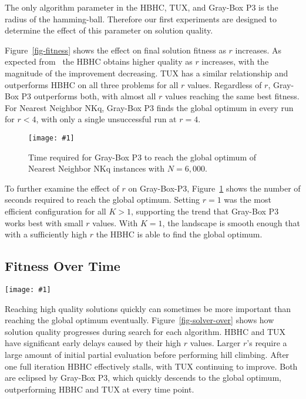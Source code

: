 \documentclass{sig-alternate}
\newcommand{\includegraphicsfit}[1]
{\texttt{[image: \#1]}}
\newcommand{\includegraphicswide}[1]
{\texttt{[image: \#1]}}
\begin{document}
The only algorithm parameter in the HBHC, TUX, and Gray-Box P3
is the radius of the hamming-ball. Therefore our first experiments are designed to determine
the effect of this parameter on solution quality.

Figure~\ref{fig-fitness} shows the effect on final solution fitness as $r$ increases. As expected
from~\cite{chicano:2014:ball} the HBHC obtains higher quality as $r$ increases, with the magnitude
of the improvement decreasing. TUX has a similar relationship and
outperforms HBHC on all three problems for all $r$ values. Regardless of $r$, Gray-Box P3 outperforms both, with almost
all $r$ values reaching the same best fitness. For Nearest Neighbor NKq, Gray-Box P3 finds the global
optimum in every run for $r < 4$, with only a single unsuccessful run at $r=4$.

\begin{figure}
  \centering
  \includegraphicsfit{p3-seconds}
  \caption{Time required for Gray-Box P3 to reach the global optimum of Nearest Neighbor NKq instances with $N=6,000$.}
  \label{fig-p3-seconds}
\end{figure}

To further examine the effect of $r$ on Gray-Box-P3, Figure~\ref{fig-p3-seconds} shows the number of
seconds required to reach the global optimum. Setting $r=1$ was the most efficient configuration for all $K > 1$,
supporting the trend that Gray-Box P3 works best with small $r$ values. With $K=1$, the landscape is smooth enough
that with a sufficiently high $r$ the HBHC is able to find the global optimum.

\subsection{Fitness Over Time}
\label{sec-over-time}
\begin{figure*}
  \centering
  \includegraphicswide{solver-over}
  \caption{Comparison of solution quality during optimization on a log-log scale for different algorithms. For NKq-Landscapes $N=6,000$ and $K=4$ and
  for Ising Spin Glasses $N=6,084$. Each algorithm uses its best found $r$ value.}
  \label{fig-solver-over}
\end{figure*}

Reaching high quality solutions quickly can sometimes be more important than reaching the global optimum
eventually. Figure~\ref{fig-solver-over} shows how solution quality progresses during
search for each algorithm. HBHC and TUX have significant early delays caused by their high $r$ values. Larger
$r$'s require a large amount of initial partial evaluation before performing hill climbing. After one full iteration
HBHC effectively stalls, with TUX continuing to improve. Both are eclipsed by Gray-Box P3,
which quickly descends to the global optimum, outperforming HBHC and TUX at every time point.
\end{document}
